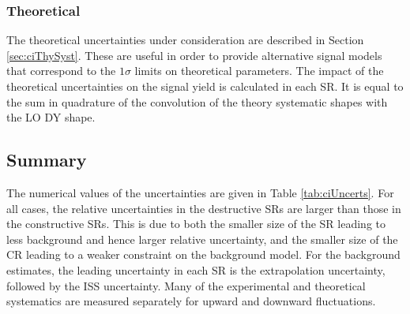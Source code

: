 \subsubsection{Theoretical}\label{sec:ciSigThySyst}
The theoretical uncertainties under consideration are described in Section \ref{sec:ciThySyst}.
These are useful in order to provide alternative signal models that correspond to the $1\sigma$ limits on theoretical parameters.
The impact of the theoretical uncertainties on the signal yield is calculated in each SR.
It is equal to the sum in quadrature of the convolution of the theory systematic shapes with the LO DY shape.


\subsection{Summary}

The numerical values of the uncertainties are given in Table \ref{tab:ciUncerts}.
For all cases, the relative uncertainties in the destructive SRs are larger than those in the constructive SRs.
This is due to both the smaller size of the SR leading to less background and hence larger relative uncertainty, and the smaller size of the CR leading to a weaker constraint on the background model.
For the background estimates, the leading uncertainty in each SR is the extrapolation uncertainty, followed by the ISS uncertainty.
Many of the experimental and theoretical systematics are measured separately for upward and downward fluctuations.


